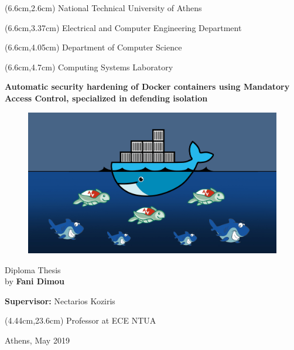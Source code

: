 \begin{mdseries}  
\begin{textblock*}{103cm}(6.6cm,2.6cm) %
\fontsize{16}{12}\selectfont 
National Technical University of Athens
\end{textblock*}
\fontsize{14}{12}\selectfont
\begin{textblock*}{103cm}(6.6cm,3.37cm)
Electrical and Computer Engineering Department
\end{textblock*}
\begin{textblock*}{103cm}(6.6cm,4.05cm)
Department of Computer Science
\end{textblock*}
\begin{textblock*}{103cm}(6.6cm,4.7cm)
Computing Systems Laboratory
\end{textblock*}

\hfill\break\hfill\break\hfill\break\hfill\break\hfill\break\hfill\break\hfill\break\hfill\break

\fontsize{18}{12}\selectfont
\begin{center}\textbf{Automatic security hardening of Docker containers using Mandatory Access Control, specialized in defending isolation}\end{center}
\hfill\break
\begin{figure}[h!]
  \centering
   \includegraphics[width=0.7\linewidth]{figures/ekswfullo11.jpg}
\end{figure}
\hfill\break
\fontsize{17}{20.5}\selectfont

\begin{center}
Diploma Thesis
\\
by \textbf{Fani Dimou}
\end{center}

\hfill\break

\hfill\break\hfill\break
\fontsize{13}{12}\selectfont
\textbf{Supervisor:} Nectarios Koziris
\begin{textblock*}{103cm}(4.44cm,23.6cm)
Professor at ECE NTUA
\end{textblock*}

\hfill\break\hfill\break\hfill\break
\begin{center}
Athens, May 2019
\end{center}

\end{mdseries}
\endgroup


